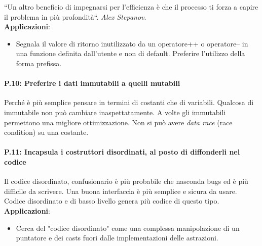 \textsf{``Un altro beneficio di impegnarsi per l'efficienza è che il processo ti forza a capire il problema in più profondità``.}
\textsf{\emph{Alex Stepanov}.} \\

\textsf{\small \textbf{Applicazioni}: }

\begin{itemize}
	\item \textsf{\small Segnala il valore di ritorno inutilizzato da un operatore++ o operatore-- in una funzione definita dall'utente e non di default. Preferire l'utilizzo della forma prefissa. }
\end{itemize}

\paragraph{P.10: Preferire i dati immutabili a quelli mutabili}

\textsf{\small Perché è più semplice pensare in termini di costanti che di variabili. Qualcosa di immutabile non può cambiare inaspettatamente. A volte gli immutabili permettono una migliore ottimizzazione. Non si può avere \emph{data race} (race condition) su una costante.} \\

\paragraph{P.11: Incapsula i costruttori disordinati, al posto di diffonderli nel codice}

\textsf{\small Il codice disordinato, confusionario è più probabile che nasconda bugs ed è più difficile da scrivere. Una buona interfaccia è più semplice e sicura da usare. Codice disordinato e di basso livello genera più codice di questo tipo.} \\

\textsf{\small \textbf{Applicazioni}: }

\begin{itemize}
	\item \textsf{\small Cerca del "codice disordinato" come una complessa manipolazione di un puntatore e dei casts fuori dalle implementazioni delle astrazioni.}
\end{itemize}

